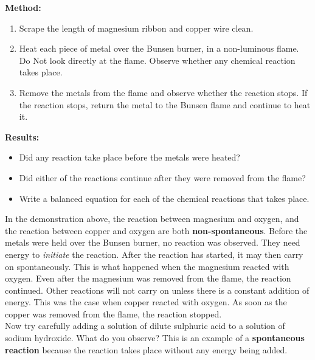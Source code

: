 {\textbf{Method:\\}

\begin{enumerate}
\item{Scrape the length of magnesium ribbon and copper wire clean.}
\item{Heat each piece of metal over the Bunsen burner, in a non-luminous flame. Do Not look directly at the flame. Observe whether any chemical reaction takes place.}
\item{Remove the metals from the flame and observe whether the reaction stops. If the reaction stops, return the metal to the Bunsen flame and continue to heat it.\\}
\end{enumerate}

\textbf{Results:\\}

\begin{itemize}
\item{Did any reaction take place before the metals were heated?}
\item{Did either of the reactions continue after they were removed from the flame?}
\item{Write a balanced equation for each of the chemical reactions that takes place.}
\end{itemize}
}

In the demonstration above, the reaction between magnesium and oxygen, and the reaction between copper and oxygen are both \textbf{non-spontaneous}. Before the metals were held over the Bunsen burner, no reaction was observed.  They need energy to \textit{initiate} the reaction. After the reaction has started, it may then carry on spontaneously. This is what happened when the magnesium reacted with oxygen. Even after the magnesium was removed from the flame, the reaction continued. Other reactions will not carry on unless there is a constant addition of energy. This was the case when copper reacted with oxygen. As soon as the copper was removed from the flame, the reaction stopped.\\

Now try carefully adding a solution of dilute sulphuric acid to a solution of sodium hydroxide. What do you observe? This is an example of a \textbf{spontaneous reaction} because the reaction takes place without any energy being added.



